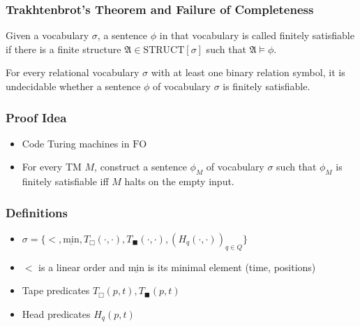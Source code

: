 \documentclass{beamer}
\newcommand{\FO}{\ensuremath{\mathrm{FO}}}
\newcommand{\structa}{\ensuremath{\mathfrak{A}}}
\newcommand{\minel}{\ensuremath{\underline{\mathrm{min}}}}
\newcommand{\blankcell}{\ensuremath{T_{\Box}}}
\newcommand{\nonblankcell}{\ensuremath{T_{\blacksquare}}}
\begin{document}
\begin{frame}
  \frametitle{Trakhtenbrot's Theorem and Failure of Completeness}

  \begin{definition}
    Given a vocabulary $\sigma$, a sentence $\phi$ in that vocabulary is called
    finitely satisfiable if there is a finite structure $\structa \in
    \mathrm{STRUCT}[\sigma]$ such that $\structa \models \phi$.
  \end{definition}
  
  \pause

  \begin{theorem}[Trakhtenbrot]
    For every relational vocabulary $\sigma$ with at least one binary relation
    symbol, it is undecidable whether a sentence $\phi$ of vocabulary
    $\sigma$ is finitely satisfiable.
  \end{theorem}

\end{frame}

\begin{frame}
  \frametitle{Proof Idea}

  \begin{itemize}
    \item Code Turing machines in $\FO$
    \item For every TM $M$, construct a sentence $\phi_M$ of vocabulary $\sigma$
    such that $\phi_M$ is finitely satisfiable iff $M$ halts on the empty input.
  \end{itemize}

\end{frame}

\begin{frame}
  \frametitle{Definitions}

  \begin{itemize}
    \item $\sigma = \{<, \minel, \blankcell(\cdot, \cdot),
    \nonblankcell(\cdot,\cdot), (H_q(\cdot, \cdot))_{q \in Q}\}$\\
    \item $<$ is a linear order and $\minel$ is its minimal element (time,
    positions)
    \item Tape predicates $\blankcell(p,t), \nonblankcell(p,t)$
    \item Head predicates $H_q(p,t)$
  \end{itemize}
 
  
\end{frame}
\end{document}
